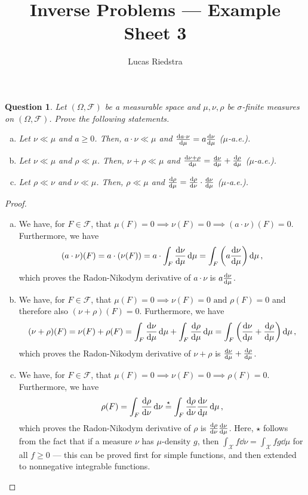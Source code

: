 \documentclass{article}
\title{Inverse Problems --- Example Sheet 3}
\author{Lucas Riedstra}
\theoremstyle{plain}
\newtheorem{question}{Question}
\theoremstyle{remark}
\newcommand{\Cal}{\mathcal}
\newcommand\XX{\Cal X}
\newcommand\FF{\Cal F}
\begin{document}
\maketitle

\begin{question}
	Let $(\Omega, \FF)$ be a measurable space and $\mu, \nu, \rho$ be $\sigma$-finite measures on $(\Omega, \FF)$. Prove the following statements.
	\begin{enumerate}[(a)]
		\item Let $\nu \ll \mu$ and $a \geq 0$. Then, $a \cdot \nu \ll \mu$ and $\dv{a\cdot \nu}{\mu} = a \dv{\nu}{\mu}$ ($\mu$-a.e.). 
		\item Let $\nu \ll \mu$ and $\rho \ll \mu$. Then, $\nu + \rho \ll \mu$ and $\dv{\nu + \rho}{\mu} = \dv{\nu}{\mu} + \dv{\rho}{\mu}$ ($\mu$-a.e.). 
		\item Let $\rho \ll \nu$ and $\nu \ll \mu$. Then, $\rho \ll \mu$ and $\dv{\rho}{\mu} = \dv{\rho}{\nu} \cdot \dv{\nu}{\mu}$ ($\mu$-a.e.). 
	\end{enumerate}
\end{question}

\begin{proof}
	\begin{enumerate}[(a)]
		\item We have, for $F \in \FF$, that $\mu(F) = 0 \implies \nu(F) = 0 \implies (a\cdot \nu)(F) = 0$. Furthermore, we have
		\[
		(a \cdot \nu)(F) = a \cdot (\nu(F)) = a \cdot \int_F \dv{\nu}{\mu} \dd{\mu} = \int_F \qty(a \dv{\nu}{\mu}) \dd{\mu}, 
		\]
		which proves the Radon-Nikodym derivative of $a\cdot\nu$ is $a \dv{\nu}{\mu}$. 
		
		\item We have, for $F \in \FF$, that $\mu(F) = 0 \implies \nu(F) = 0 \text{ and } \rho(F) = 0$ and therefore also $(\nu + \rho)(F) =0$. Furthermore, we have
		\[
		(\nu + \rho)(F) = \nu(F) + \rho(F) = \int_F\dv{\nu}{\mu} \dd{\mu} + \int_F \dv{\rho}{\mu} \dd{\mu} = \int_F \qty(\dv{\nu}{\mu} + \dv{\rho}{\mu}) \dd{\mu}, 
		\]
		which proves the Radon-Nikodym derivative of $\nu + \rho$ is $\dv{\nu}{\mu} + \dv{\rho}{\mu}$. 
		
		\item We have, for $F \in \FF$, that $\mu(F) = 0\implies \nu(F) = 0 \implies \rho(F) = 0$. Furthermore, we have
		\[
		\rho(F) = \int_F \dv{\rho}{\nu} \dd{\nu} \overset\star= \int_F \dv{\rho}{\nu} \dv{\nu}{\mu} \dd{\mu},
		\]
		which proves the Radon-Nikodym derivative of $\rho$ is $\dv{\rho}{\nu} \dv{\nu}{\mu}$. Here, $\star$ follows from the fact that if a measure $\nu$ has $\mu$-density $g$, then $\int_\XX f \dd{\nu} = \int_\XX fg \dd{\mu}$ for all $f \geq 0$ --- this can be proved first for simple functions, and then extended to nonnegative integrable functions. 
	\end{enumerate}
\end{proof}
\end{document}
